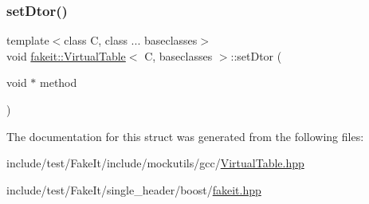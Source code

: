 \mbox{\label{structfakeit_1_1VirtualTable_adee13076280ff9bd4c06b5f1e62d6708}} 
\subsubsection{\texorpdfstring{setDtor()}{setDtor()}\hspace{0.1cm}{\footnotesize\ttfamily [10/10]}}
{\footnotesize\ttfamily template$<$class C, class ... baseclasses$>$ \\
void \mbox{\hyperlink{structfakeit_1_1VirtualTable}{fakeit\+::\+Virtual\+Table}}$<$ C, baseclasses $>$\+::set\+Dtor (\begin{DoxyParamCaption}\item[{void $\ast$}]{method }\end{DoxyParamCaption})\hspace{0.3cm}{\ttfamily [inline]}}



The documentation for this struct was generated from the following files\+:\begin{DoxyCompactItemize}
\item 
include/test/\+Fake\+It/include/mockutils/gcc/\mbox{\hyperlink{gcc_2VirtualTable_8hpp}{Virtual\+Table.\+hpp}}\item 
include/test/\+Fake\+It/single\+\_\+header/boost/\mbox{\hyperlink{single__header_2boost_2fakeit_8hpp}{fakeit.\+hpp}}\end{DoxyCompactItemize}
